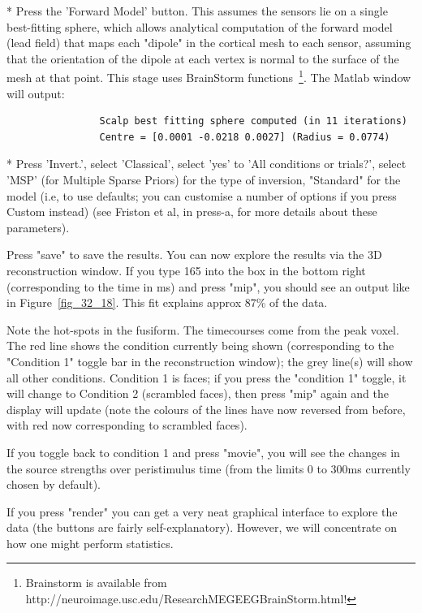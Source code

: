 * Press the 'Forward Model' button. This assumes the sensors lie on a single best-fitting sphere, which allows analytical computation of the forward model (lead field) that maps each "dipole" in the cortical mesh to each sensor, assuming that the orientation of the dipole at each vertex is normal to the surface of the mesh at that point. This stage uses BrainStorm functions~\footnote{Brainstorm is available from http://neuroimage.usc.edu/ResearchMEGEEGBrainStorm.html!}. The Matlab window will output:
\begin{verbatim}
                Scalp best fitting sphere computed (in 11 iterations)
                Centre = [0.0001 -0.0218 0.0027] (Radius = 0.0774)
\end{verbatim}
* Press 'Invert.', select 'Classical', select 'yes' to 'All conditions or trials?', select 'MSP' (for Multiple Sparse Priors) for the type of inversion, "Standard" for the model (i.e, to use defaults; you can customise a number of options if you press Custom instead) (see Friston et al, in press-a, for more details about these parameters).

Press "save" to save the results. You can now explore the results via the 3D reconstruction window. If you type 165 into the box in the bottom right (corresponding to the time in ms) and press "mip", you should see an output like in Figure~\ref{fig_32_18}. This fit explains approx 87\% of the data.

Note the hot-spots in the fusiform. The timecourses come from the peak voxel. The red line shows the condition currently being shown (corresponding to the "Condition 1" toggle bar in the reconstruction window); the grey line(s) will show all other conditions. Condition 1 is faces; if you press the "condition 1" toggle, it will change to Condition 2 (scrambled faces), then press "mip" again and the display will update (note the colours of the lines have now reversed from before, with red now corresponding to scrambled faces).

If you toggle back to condition 1 and press "movie", you will see the changes in the source strengths over peristimulus time (from the limits 0 to 300ms currently chosen by default).

If you press "render" you can get a very neat graphical interface to explore the data (the buttons are fairly self-explanatory). However, we will concentrate on how one might perform statistics.


